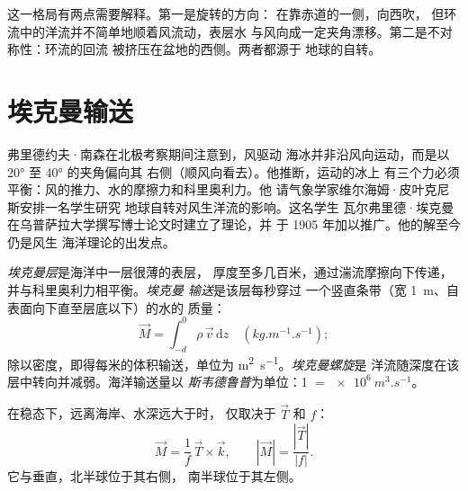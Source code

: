 这一格局有两点需要解释。第一是旋转的方向：
在靠赤道的一侧，向西吹，
但环流中的洋流并不简单地顺着风流动，表层水
与风向成一定夹角漂移。第二是不对称性：环流的回流
被挤压在盆地的西侧。两者都源于
地球的自转。

\section{埃克曼输送}\label{sec:b1:ocean-circulation:ekman}

\begin{history}[南森与埃克曼，1898--1905]
弗里德约夫·南森在北极考察期间注意到，风驱动
海冰并非沿风向运动，而是以 \ang{20} 至 \ang{40} 的夹角偏向其
右侧（顺风向看去）。他推断，运动的冰上
有三个力必须平衡：风的推力、水的摩擦力和科里奥利力。他
请气象学家维尔海姆·皮叶克尼斯安排一名学生研究
地球自转对风生洋流的影响。这名学生
瓦尔弗里德·埃克曼在乌普萨拉大学撰写博士论文时建立了理论，并
于 1905 年加以推广。他的解至今仍是风生
海洋理论的出发点。
\end{history}

\begin{definition}\label{def:b1:ocean-circulation:ekman}
\emph{埃克曼层}是海洋中一层很薄的表层，
厚度至多几百米，通过湍流摩擦向下传递，
并与科里奥利力相平衡。\emph{埃克曼
输送}是该层每秒穿过
一个竖直条带（宽 \qty{1}{m}、自表面向下直至层底以下）的水的
质量：
\[
  \vec M = \int_{-d}^{0} \rho\,\vec v\,\mathrm dz \quad (\unit{kg.m^{-1}.s^{-1}});
\]
除以密度，即得每米的体积输送，单位为
\unit{m^2.s^{-1}}。\emph{埃克曼螺旋}是
洋流随深度在该层中转向并减弱。海洋输送量以
\emph{斯韦德鲁普}为单位：\qty{1}{\sverdrup} $=
\qty{e6}{m^3.s^{-1}}$。
\end{definition}

\begin{theorem}[埃克曼输送]\label{thm:b1:ocean-circulation:ekman}
在稳态下，远离海岸、水深远大于时，
仅取决于 $\vec T$ 和 $f$：
\[
  \vec M = \frac{1}{f}\,\vec T\times\vec k,
  \qquad |\vec M| = \frac{|\vec T|}{|f|}.
\]
它与垂直，北半球位于其右侧，
南半球位于其左侧。
\end{theorem}

